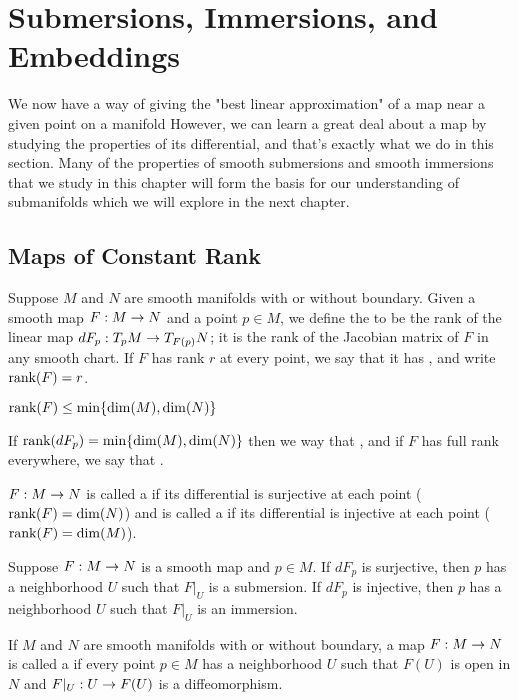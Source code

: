 \newpage\setcounter{section}{3}
\section{Submersions, Immersions, and Embeddings}

We now have a way of giving the "best linear approximation" of a map near a given point on a manifold However, we can learn a great deal about a map by studying the properties of its differential, and that's exactly what we do in this section. Many of the properties of smooth submersions and smooth immersions that we study in this chapter will form the basis for our understanding of submanifolds which we will explore in the next chapter.

\subsection{Maps of Constant Rank}\nl

\dfn Suppose $M$ and $N$ are smooth manifolds with or without boundary. Given a smooth map $F:M\rightarrow N$ and a point $p\in M$, we define the  to be the rank of the linear map $dF_p:T_pM\rightarrow T_{F(p)}N$; it is the rank of the Jacobian matrix of $F$ in any smooth chart. If $F$ has rank $r$ at every point, we say that it has , and write $\text{rank}(F) = r$.

\nb $\text{rank}(F) \leq \min\{\dim(M),\dim(N)\}$

\dfn If $\text{rank}(dF_p) = \min\{\dim(M),\dim(N)\}$ then we way that , and if $F$ has full rank everywhere, we say that .

\dfn $F:M\rightarrow N$ is called a  if its differential is surjective at each point ($\text{rank}(F) = \dim(N)$) and is called a  if its differential is injective at each point ($\text{rank}(F) = \dim(M)$).

\begin{prop}
Suppose $F:M\rightarrow  N$ is a smooth map and $p\in M$. If $dF_p$ is surjective, then $p$ has a neighborhood $U$ such that $F|_U$ is a submersion. If $dF_p$ is injective, then $p$ has a neighborhood $U$ such that $F|_U$ is an immersion.
\end{prop}

\dfn If $M$ and $N$ are smooth manifolds with or without boundary, a map $F:M\rightarrow N$ is called a  if every point $p\in M$ has a neighborhood $U$ such that $F(U)$ is open in $N$ and $F|_U:U\rightarrow F(U)$ is a diffeomorphism.

